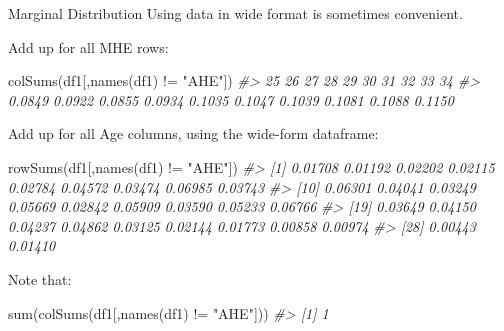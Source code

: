 \documentclass[
  11pt,
  ignorenonframetext,
  svgnames, handout, t]{beamer}
\newenvironment{Shaded}{\begin{snugshade}}{\end{snugshade}}
\newcommand{\CommentTok}[1]{\textcolor[rgb]{0.56,0.35,0.01}{\textit{#1}}}
\newcommand{\FunctionTok}[1]{\textcolor[rgb]{0.00,0.00,0.00}{#1}}
\newcommand{\NormalTok}[1]{#1}
\newcommand{\SpecialCharTok}[1]{\textcolor[rgb]{0.00,0.00,0.00}{#1}}
\newcommand{\StringTok}[1]{\textcolor[rgb]{0.31,0.60,0.02}{#1}}
\begin{document}
\begin{frame}[fragile]{Marginal Distribution}
\protect\hypertarget{marginal-distribution-3}{}
Using data in wide format is sometimes convenient.

Add up for all MHE rows:

\footnotesize

\begin{Shaded}
\begin{Highlighting}[]
\FunctionTok{colSums}\NormalTok{(df1[,}\FunctionTok{names}\NormalTok{(df1) }\SpecialCharTok{!=} \StringTok{"AHE"}\NormalTok{])}
\CommentTok{\#\textgreater{}     25     26     27     28     29     30     31     32     33     34 }
\CommentTok{\#\textgreater{} 0.0849 0.0922 0.0855 0.0934 0.1035 0.1047 0.1039 0.1081 0.1088 0.1150}
\end{Highlighting}
\end{Shaded}

\normalsize

Add up for all Age columns, using the wide-form dataframe:

\footnotesize

\begin{Shaded}
\begin{Highlighting}[]
\FunctionTok{rowSums}\NormalTok{(df1[,}\FunctionTok{names}\NormalTok{(df1) }\SpecialCharTok{!=} \StringTok{"AHE"}\NormalTok{])}
\CommentTok{\#\textgreater{}  [1] 0.01708 0.01192 0.02202 0.02115 0.02784 0.04572 0.03474 0.06985 0.03743}
\CommentTok{\#\textgreater{} [10] 0.06301 0.04041 0.03249 0.05669 0.02842 0.05909 0.03590 0.05233 0.06766}
\CommentTok{\#\textgreater{} [19] 0.03649 0.04150 0.04237 0.04862 0.03125 0.02144 0.01773 0.00858 0.00974}
\CommentTok{\#\textgreater{} [28] 0.00443 0.01410}
\end{Highlighting}
\end{Shaded}

\normalsize

Note that:

\footnotesize

\begin{Shaded}
\begin{Highlighting}[]
\FunctionTok{sum}\NormalTok{(}\FunctionTok{colSums}\NormalTok{(df1[,}\FunctionTok{names}\NormalTok{(df1) }\SpecialCharTok{!=} \StringTok{"AHE"}\NormalTok{]))}
\CommentTok{\#\textgreater{} [1] 1}
\end{Highlighting}
\end{Shaded}

\normalsize
\end{frame}
\end{document}
